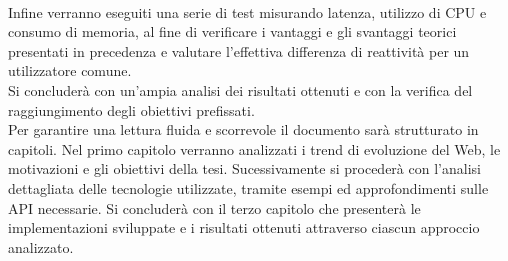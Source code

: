 \\Infine verranno eseguiti una serie di test misurando latenza, utilizzo di CPU e consumo di memoria, al fine di verificare i vantaggi e gli svantaggi teorici presentati in precedenza e valutare l'effettiva differenza di reattività per un utilizzatore comune.
\\Si concluderà con un'ampia analisi dei risultati ottenuti e con la verifica del raggiungimento degli obiettivi prefissati.
\\Per garantire una lettura fluida e scorrevole il documento sarà strutturato in capitoli. Nel primo capitolo verranno analizzati i trend di evoluzione del Web, le motivazioni e gli obiettivi della tesi.
Sucessivamente si procederà con l'analisi dettagliata delle tecnologie utilizzate, tramite esempi ed approfondimenti sulle API necessarie.
Si concluderà con il terzo capitolo che presenterà le implementazioni sviluppate e i risultati ottenuti attraverso ciascun approccio analizzato.